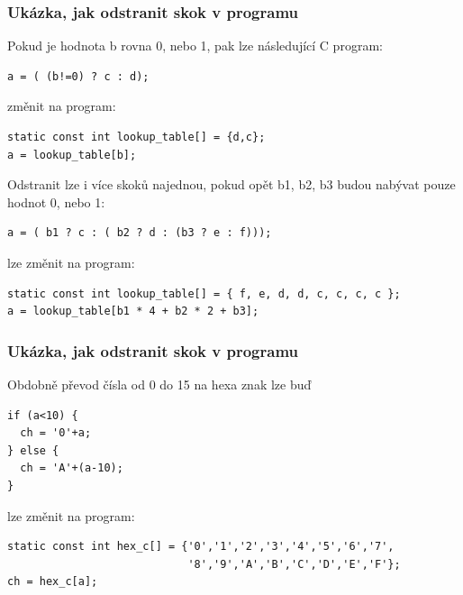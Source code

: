 \documentclass{beamer}
\begin{document}
\begin{frame}[fragile]
\frametitle{Ukázka, jak odstranit skok v programu}

Pokud je hodnota b rovna 0, nebo 1, pak lze následující C program:

\begin{verbatim}
a = ( (b!=0) ? c : d);
\end{verbatim}

změnit na program:

\begin{verbatim}
static const int lookup_table[] = {d,c};
a = lookup_table[b];
\end{verbatim}

\bigskip
Odstranit lze i více skoků najednou, pokud opět b1, b2, b3 budou nabývat pouze hodnot 0, nebo 1:

\begin{verbatim}
a = ( b1 ? c : ( b2 ? d : (b3 ? e : f)));
\end{verbatim}

lze změnit na program:

\begin{verbatim}
static const int lookup_table[] = { f, e, d, d, c, c, c, c };
a = lookup_table[b1 * 4 + b2 * 2 + b3];
\end{verbatim}
\end{frame}

\begin{frame}[fragile]
\frametitle{Ukázka, jak odstranit skok v programu}

Obdobně převod čísla od 0 do 15 na hexa znak lze buď
\begin{verbatim}
if (a<10) {
  ch = '0'+a;
} else {
  ch = 'A'+(a-10);
}
\end{verbatim}

lze změnit na program:

\begin{verbatim}
static const int hex_c[] = {'0','1','2','3','4','5','6','7',
                            '8','9','A','B','C','D','E','F'};
ch = hex_c[a];
\end{verbatim}

\end{frame}
\end{document}
